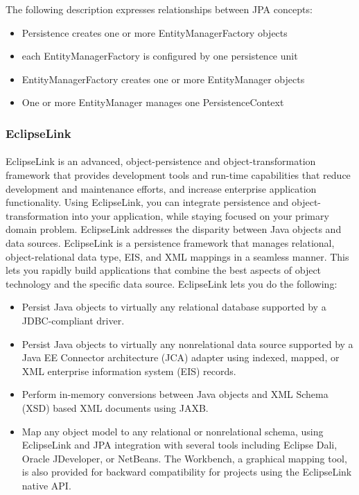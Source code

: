 \begin{itemize}
The following description expresses relationships between JPA concepts:
\begin{itemize}
\item Persistence creates one or more EntityManagerFactory objects
\item each EntityManagerFactory is configured by one persistence unit
\item EntityManagerFactory creates one or more EntityManager objects
\item One or more EntityManager manages one PersistenceContext
\end{itemize}
\end{itemize}
\subsubsection{EclipseLink}
\paragraph{}
EclipseLink is an advanced, object-persistence and object-transformation
framework that provides development tools and run-time capabilities that reduce
development and maintenance efforts, and increase enterprise application
functionality. Using EclipseLink, you can integrate persistence and
object-transformation into your application, while staying focused on your
primary domain problem. EclipseLink addresses the disparity between Java objects
and data sources. EclipseLink is a persistence framework that manages
relational, object-relational data type, EIS, and XML mappings in a seamless
manner. This lets you rapidly build applications that combine the best aspects
of object technology and the specific data source. EclipseLink lets you do the following:

\begin{itemize}
\item Persist Java objects to virtually any relational database supported by a JDBC-compliant driver.
\item Persist Java objects to virtually any nonrelational data source supported by a Java EE Connector architecture (JCA) adapter using indexed, mapped, or XML enterprise information system (EIS) records.
\item Perform in-memory conversions between Java objects and XML Schema (XSD) based XML documents using JAXB.
\item Map any object model to any relational or nonrelational schema, using EclipseLink and JPA integration with several tools including Eclipse Dali, Oracle JDeveloper, or NetBeans. The Workbench, a graphical mapping tool, is also provided for backward compatibility for projects using the EclipseLink native API.
\end{itemize}

